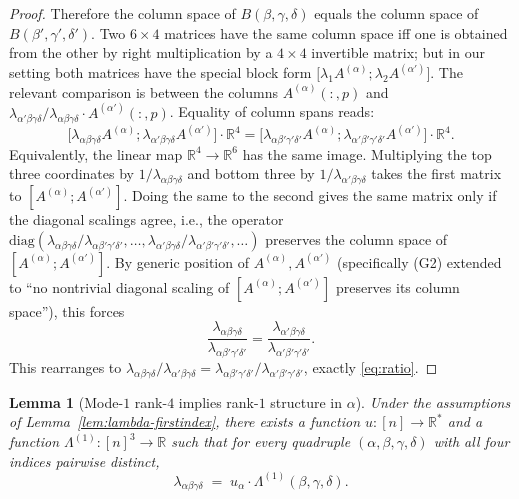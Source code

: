 \documentclass[12pt]{article}
\newtheorem{lemma}[theorem]{Lemma}
\theoremstyle{definition}
\begin{document}
\begin{proof}
Therefore the column space of $B(\beta,\gamma,\delta)$ equals the column space of
$B(\beta',\gamma',\delta')$. Two $6\times 4$ matrices have the same column space iff one is
obtained from the other by right multiplication by a $4\times 4$ invertible matrix; but in
our setting both matrices have the special block form
$\bigl[\lambda_1 A^{(\alpha)};\lambda_2 A^{(\alpha')}\bigr]$. The relevant comparison is
between the columns $A^{(\alpha)}(:,p)$ and $\lambda_{\alpha'\beta\gamma\delta}/\lambda_{\alpha\beta\gamma\delta}\cdot A^{(\alpha')}(:,p)$.
Equality of column spans reads:
\[
\bigl[\lambda_{\alpha\beta\gamma\delta}A^{(\alpha)};\lambda_{\alpha'\beta\gamma\delta}A^{(\alpha')}\bigr]\cdot \mathbb{R}^4
=\bigl[\lambda_{\alpha\beta'\gamma'\delta'}A^{(\alpha)};\lambda_{\alpha'\beta'\gamma'\delta'}A^{(\alpha')}\bigr]\cdot \mathbb{R}^4.
\]
Equivalently, the linear map $\mathbb{R}^4\to\mathbb{R}^6$ has the same image. Multiplying
the top three coordinates by $1/\lambda_{\alpha\beta\gamma\delta}$ and bottom three by
$1/\lambda_{\alpha'\beta\gamma\delta}$ takes the first matrix to
$[A^{(\alpha)};A^{(\alpha')}]$. Doing the same to the second gives the same matrix only if
the diagonal scalings agree, i.e., the operator
$\mathrm{diag}(\lambda_{\alpha\beta\gamma\delta}/\lambda_{\alpha\beta'\gamma'\delta'},\ldots,
\lambda_{\alpha'\beta\gamma\delta}/\lambda_{\alpha'\beta'\gamma'\delta'},\ldots)$
preserves the column space of $[A^{(\alpha)};A^{(\alpha')}]$. By generic position of
$A^{(\alpha)},A^{(\alpha')}$ (specifically (G2) extended to ``no nontrivial diagonal scaling
of $[A^{(\alpha)};A^{(\alpha')}]$ preserves its column space''), this forces
\[
\frac{\lambda_{\alpha\beta\gamma\delta}}{\lambda_{\alpha\beta'\gamma'\delta'}}
=\frac{\lambda_{\alpha'\beta\gamma\delta}}{\lambda_{\alpha'\beta'\gamma'\delta'}}.
\]
This rearranges to $\lambda_{\alpha\beta\gamma\delta}/\lambda_{\alpha'\beta\gamma\delta}
=\lambda_{\alpha\beta'\gamma'\delta'}/\lambda_{\alpha'\beta'\gamma'\delta'}$, exactly
\eqref{eq:ratio}.
\end{proof}

\begin{lemma}[Mode-$1$ rank-$4$ implies rank-$1$ structure in $\alpha$]\label{lem:rank1-alpha}
Under the assumptions of Lemma~\ref{lem:lambda-firstindex}, there exists a function
$u:[n]\to\mathbb{R}^*$ and a function $\Lambda^{(1)}:[n]^3\to\mathbb{R}$ such that for every
quadruple $(\alpha,\beta,\gamma,\delta)$ with all four indices pairwise distinct,
\begin{equation}\label{eq:rank1-alpha}
\lambda_{\alpha\beta\gamma\delta}\;=\;u_\alpha\cdot\Lambda^{(1)}(\beta,\gamma,\delta).
\end{equation}
\end{lemma}
\end{document}
